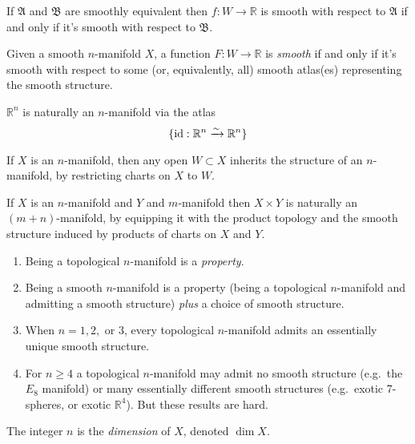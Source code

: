 \documentclass[a4paper,11pt]{article}
\begin{document}
	\begin{lem}
		If $\mathfrak{A}$ and $\mathfrak{B}$ are smoothly equivalent then $f: W \to \mathbb{R}$ is smooth with respect to $\mathfrak{A}$ if and only if it's smooth with respect to $\mathfrak{B}$.
	\end{lem}

	\begin{defi}
		Given a smooth $n$-manifold $X$, a function $F: W \to \mathbb{R}$ is \emph{smooth} if and only if it's smooth with respect to some (or, equivalently, all) smooth atlas(es) representing the smooth structure.
	\end{defi}

	\begin{ex}
		$\mathbb{R}^n$ is naturally an $n$-manifold via the atlas
		\[
			\{\operatorname{id}: \mathbb{R}^n \xrightarrow{\sim}\mathbb{R}^n\}
		\]
	\end{ex}
	\begin{ex}
		If $X$ is an $n$-manifold, then any open $W \subset X$ inherits the structure of an $n$-manifold, by restricting charts on $X$ to $W$.
	\end{ex}

	\begin{ex}
		If $X$ is an $n$-manifold and $Y$ and $m$-manifold then $X \times Y$ is naturally an $(m+n)$-manifold, by equipping it with the product topology and the smooth structure induced by products of charts on $X$ and $Y$.
	\end{ex}

	\begin{rmk}
		\begin{enumerate}
			\item Being a topological $n$-manifold is a \emph{property}.
			\item Being a smooth $n$-manifold is a property (being a topological $n$-manifold and admitting a smooth structure) \emph{plus} a choice of smooth structure.
			\item When $n = 1,2,$ or $3$, every topological $n$-manifold admits an essentially unique smooth structure.
			\item For $n \geq 4$ a topological $n$-manifold may admit no smooth structure (e.g.\ the $E_8$ manifold) or many essentially different smooth structures (e.g.\ exotic 7-spheres, or exotic $\mathbb{R}^4$). But these results are hard. 
		\end{enumerate}
	\end{rmk}

	\begin{defi}
		The integer $n$ is the \emph{dimension} of $X$, denoted $\dim X$.
	\end{defi}
\end{document}
